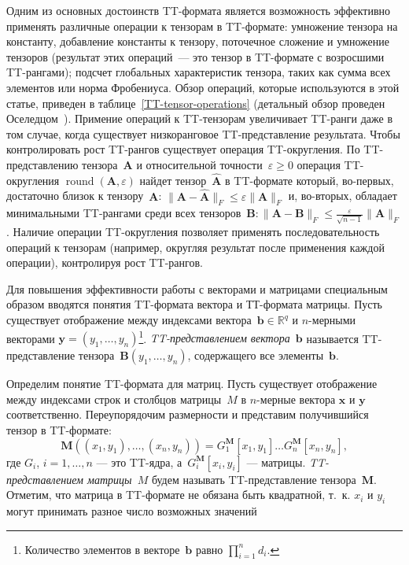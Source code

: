 \documentclass{article} %
\DeclareMathOperator{\round}{round}
\renewcommand{\vec}[1]{\boldsymbol{#1}}
\begin{document}
Одним из основных достоинств TT\hyp{}формата является возможность эффективно применять различные операции к тензорам в TT\hyp{}формате:
умножение тензора на константу, добавление константы к тензору, поточечное сложение и умножение тензоров (результат этих операций~--- это тензор в TT\hyp{}формате с возросшими TT\hyp{}рангами); подсчет глобальных характеристик тензора, таких как сумма всех элементов или норма Фробениуса. Обзор операций, которые используются в этой статье, приведен в таблице~\ref{TT-tensor-operations} (детальный обзор проведен Оселедцом~\cite{oseledets2011ttMain}).
Примение операций к TT\hyp{}тензорам увеличивает TT\hyp{}ранги даже в том случае, когда существует низкоранговое TT\hyp{}представление результата. Чтобы контролировать рост TT\hyp{}рангов существует операция TT\hyp{}округления.
По TT\hyp{}представлению тензора~$\mathbf{A}$ и относительной точности~$\varepsilon \geq 0$ операция TT\hyp{}округления $\round(\mathbf{A},\varepsilon)$ найдет тензор~$\widehat{\mathbf{A}}$ в TT\hyp{}формате который, во-первых, достаточно близок к тензору~$\mathbf{A}$: $\| \mathbf{A} - \mathbf{\widehat{A}} \|_F \leq \varepsilon  \| \mathbf{A}  \|_F$ и, во-вторых, обладает минимальными TT\hyp{}рангами среди всех тензоров~$\mathbf{B}: \| \mathbf{A} - \mathbf{B} \|_F \leq \frac{\varepsilon}{\sqrt{n - 1}}  \| \mathbf{A}  \|_F$. Наличие операции TT\hyp{}округления позволяет применять последовательность операций к тензорам (например, округляя результат после применения каждой операции), контролируя рост TT\hyp{}рангов.


Для повышения эффективности работы с векторами и матрицами специальным образом вводятся понятия TT\hyp{}формата вектора и ТТ\hyp{}формата матрицы.
Пусть существует отображение между индексами вектора~$\vec{b}\in\mathbb{R}^q$ и $n$-мерными векторами $\vec{y} = (y_1, \dots, y_n)$\footnote{
Количество элементов в векторе~$\vec{b}$ равно $\prod_{i = 1}^n d_i$.
}.
\emph{TT\hyp{}представлением вектора~$\vec{b}$} называется TT\hyp{}представление тензора~$\mathbf{B}(y_1, \dots, y_n)$, содержащего все элементы~$\vec{b}$.


Определим понятие TT\hyp{}формата для матриц. Пусть существует отображение между индексами строк и столбцов матрицы~$M$ в $n$-мерные вектора $\vec{x}$ и $\vec{y}$ соответственно. Переупорядочим размерности и представим получившийся тензор в TT\hyp{}формате:
\begin{equation*}
\mathbf{M}((x_1, y_1),\ldots,(x_n,y_n))=G_1^{\mathbf{M}}[x_1,y_1]\dots G_n^{\mathbf{M}}[x_n,y_n],
\end{equation*}
где $G_i$, $i = 1,\dots,n$ --- это TT\hyp{}ядра, а~$G_i^{\mathbf{M}}[x_i,y_i]$ --- матрицы. \emph{TT\hyp{}представлением матрицы~$M$} будем называть TT\hyp{}представление тензора~$\mathbf{M}$. Отметим, что матрица в TT\hyp{}формате не обязана быть квадратной, т.~к. $x_i$ и $y_i$ могут принимать разное число возможных значений
\end{document}
